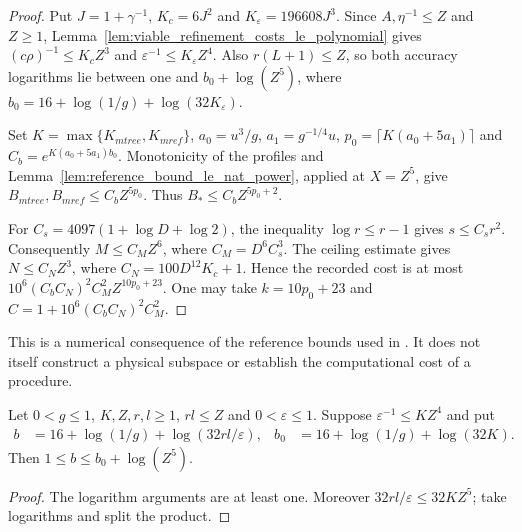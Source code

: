 \begin{proof}\leanok
    Put $J=1+\gamma^{-1}$, $K_c=6J^2$ and
    $K_\varepsilon=196608J^3$. Since $A,\eta^{-1}\leq Z$ and $Z\geq1$,
    Lemma~\ref{lem:viable_refinement_costs_le_polynomial} gives
    $(c\rho)^{-1}\leq K_cZ^3$ and
    $\varepsilon^{-1}\leq K_\varepsilon Z^4$.
    Also $r(L+1)\leq Z$, so both accuracy logarithms lie between one
    and $b_0+\log(Z^5)$, where
    $b_0=16+\log(1/g)+\log(32K_\varepsilon)$.

    Set $K=\max\{K_{
                m tree},K_{
                m ref}\}$,
    $a_0=u^3/g$, $a_1=g^{-1/4}u$,
    $p_0=\lceil K(a_0+5a_1)\rceil$ and
    $C_b=e^{K(a_0+5a_1)b_0}$.
    Monotonicity of the profiles and
    Lemma~\ref{lem:reference_bound_le_nat_power}, applied at $X=Z^5$,
    give $B_{
                m tree},B_{
                m ref}\leq C_bZ^{5p_0}$.
    Thus $B_*\leq C_bZ^{5p_0+2}$.

    For $C_s=4097(1+\log D+\log2)$,
    the inequality $\log r\leq r-1$ gives $s\leq C_sr^2$.
    Consequently $M\leq C_MZ^6$, where $C_M=D^6C_s^3$.
    The ceiling estimate gives $N\leq C_NZ^3$, where
    $C_N=100D^{12}K_c+1$.
    Hence the recorded cost is at most
    $10^6(C_bC_N)^2C_M^2Z^{10p_0+23}$.
    One may take $k=10p_0+23$ and
    $C=1+10^6(C_bC_N)^2C_M^2$.
\end{proof}

This is a numerical consequence of the reference bounds used in
\cite[lines 1777--1817]{Arad2016RigorousRG}. It does not itself construct
a physical subspace or establish the computational cost of a procedure.


\begin{lemma}
    \label{lem:reference_accuracy_log_profile}
    \leanok
    Let $0<g\le1$, $K,Z,r,l\ge1$, $rl\le Z$ and
    $0<\varepsilon\le1$. Suppose $\varepsilon^{-1}\le KZ^4$ and put
    \begin{align}
        b   & =16+\log(1/g)+\log(32rl/\varepsilon), &
        b_0 & =16+\log(1/g)+\log(32K).
        \label{eq:reference_accuracy_profile}
    \end{align}
    Then $1\le b\le b_0+\log(Z^5)$.
\end{lemma}
\begin{proof}\leanok
    The logarithm arguments are at least one. Moreover
    $32rl/\varepsilon\le32KZ^5$; take logarithms and split the product.
\end{proof}


